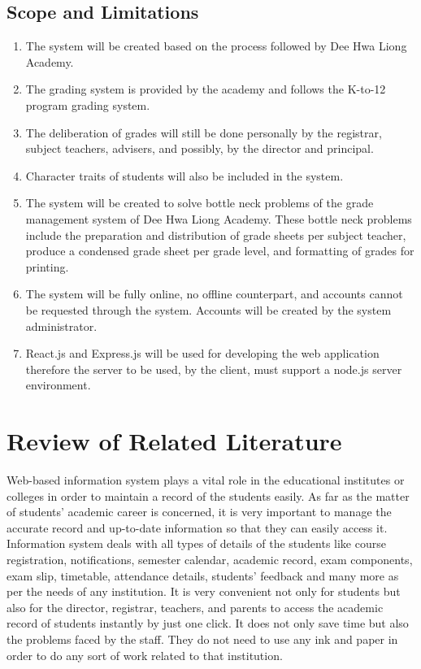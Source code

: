 \documentclass[11pt,a4paper,titlepage]{article}
\let\stdsection\section
\renewcommand\section{\newpage\stdsection}
\begin{document}
\subsection{Scope and Limitations}
\begin{enumerate}
	\item The system will be created based on the process followed by Dee Hwa Liong Academy.
	\item The grading system is provided by the academy and follows the K-to-12 program grading system.
	\item The deliberation of grades will still be done personally by the registrar, subject teachers, advisers, and possibly, by the director and principal.
	\item Character traits of students will also be included in the system.
	\item The system will be created to solve bottle neck problems of the grade management system of Dee Hwa Liong Academy. These bottle neck problems include the preparation and distribution of grade sheets per subject teacher, produce a condensed grade sheet per grade level, and formatting of grades for printing.
	\item The system will be fully online, no offline counterpart, and accounts cannot be requested through the system. Accounts will be created by the system administrator.
	\item React.js and Express.js will be used for developing the web application therefore the server to be used, by the client, must support a node.js server environment.
\end{enumerate}

\section{Review of Related Literature}
Web-based information system plays a vital role in the educational institutes or colleges in order to maintain a record of the students easily. As far as the matter of students’ academic career is concerned, it is very important to manage the accurate record and up-to-date information so that they can easily access it. Information system deals with all types of details of the students like course registration, notifications, semester calendar, academic record, exam components, exam slip, timetable, attendance details, students’ feedback and many more as per the needs of any institution. It is very convenient not only for students but also for the director, registrar, teachers, and parents to access the academic record of students instantly by just one click. It does not only save time but also the problems faced by the staff. They do not need to use any ink and paper in order to do any sort of work related to that institution. 
\end{document}
